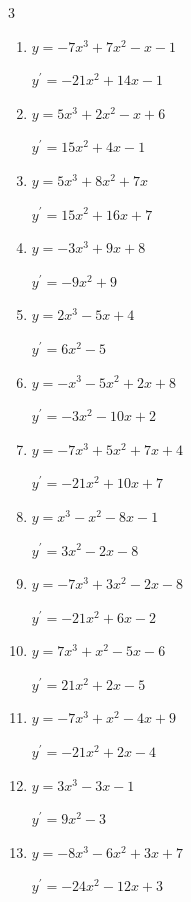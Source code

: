 \begin{multicols}{3}
\begin{enumerate}
  \item $y=-7x^{3}+7x^{2}-x-1$

        $\displaystyle y^{\prime}=-21x^{2}+14x-1$

  \item $y=5x^{3}+2x^{2}-x+6$

        $\displaystyle y^{\prime}=15x^{2}+4x-1$

  \item $y=5x^{3}+8x^{2}+7x$

        $\displaystyle y^{\prime}=15x^{2}+16x+7$

  \item $y=-3x^{3}+9x+8$

        $\displaystyle y^{\prime}=-9x^{2}+9$

  \item $y=2x^{3}-5x+4$

        $\displaystyle y^{\prime}=6x^{2}-5$

  \item $y=-x^{3}-5x^{2}+2x+8$

        $\displaystyle y^{\prime}=-3x^{2}-10x+2$

  \item $y=-7x^{3}+5x^{2}+7x+4$

        $\displaystyle y^{\prime}=-21x^{2}+10x+7$

  \item $y=x^{3}-x^{2}-8x-1$

        $\displaystyle y^{\prime}=3x^{2}-2x-8$

  \item $y=-7x^{3}+3x^{2}-2x-8$

        $\displaystyle y^{\prime}=-21x^{2}+6x-2$

  \item $y=7x^{3}+x^{2}-5x-6$

        $\displaystyle y^{\prime}=21x^{2}+2x-5$

\columnbreak %

  \item $y=-7x^{3}+x^{2}-4x+9$

        $\displaystyle y^{\prime}=-21x^{2}+2x-4$

  \item $y=3x^{3}-3x-1$

        $\displaystyle y^{\prime}=9x^{2}-3$

  \item $y=-8x^{3}-6x^{2}+3x+7$

        $\displaystyle y^{\prime}=-24x^{2}-12x+3$


\end{enumerate}
\end{multicols}

